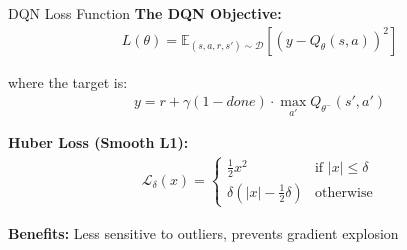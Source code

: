 \documentclass[aspectratio=169,10pt]{beamer}
\begin{document}
\begin{frame}{DQN Loss Function}
\textbf{The DQN Objective:}
\begin{align}
L(\theta) = \mathbb{E}_{(s,a,r,s') \sim \mathcal{D}} \left[ \left( y - Q_\theta(s,a) \right)^2 \right]
\end{align}

where the target is:
\begin{align}
y = r + \gamma (1 - done) \cdot \max_{a'} Q_{\theta^-}(s', a')
\end{align}

\vspace{0.3cm}
\textbf{Huber Loss (Smooth L1):}
\begin{align}
\mathcal{L}_\delta(x) = \begin{cases}
\frac{1}{2}x^2 & \text{if } |x| \leq \delta \\
\delta(|x| - \frac{1}{2}\delta) & \text{otherwise}
\end{cases}
\end{align}

\textbf{Benefits:} Less sensitive to outliers, prevents gradient explosion
\end{frame}
\end{document}
